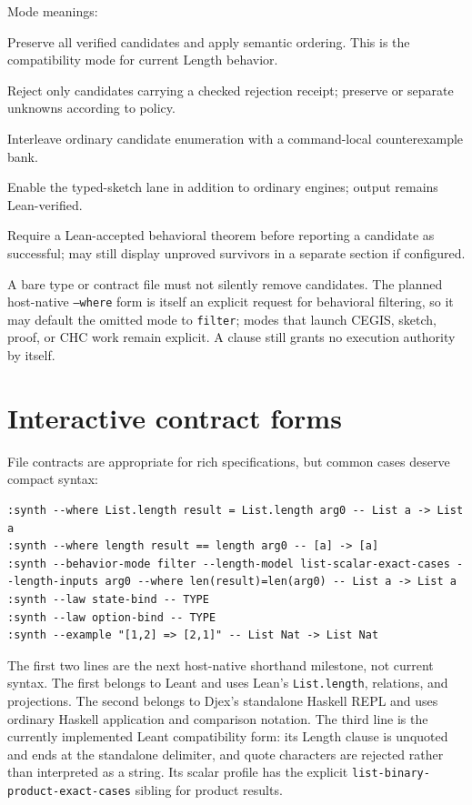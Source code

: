 \documentclass[11pt,oneside]{report}
\newcommand{\code}[1]{\texttt{#1}}
\begin{document}
Mode meanings:

\begin{description}[leftmargin=2.2em,style=nextline]
\item[rank.] Preserve all verified candidates and apply semantic ordering. This is the compatibility mode for current Length behavior.
\item[filter.] Reject only candidates carrying a checked rejection receipt; preserve or separate unknowns according to policy.
\item[cegis.] Interleave ordinary candidate enumeration with a command-local counterexample bank.
\item[sketch.] Enable the typed-sketch lane in addition to ordinary engines; output remains Lean-verified.
\item[prove.] Require a Lean-accepted behavioral theorem before reporting a candidate as successful; may still display unproved survivors in a separate section if configured.
\end{description}

A bare type or contract file must not silently remove candidates. The planned
host-native \code{--where} form is itself an explicit request for behavioral
filtering, so it may default the omitted mode to \code{filter}; modes that
launch CEGIS, sketch, proof, or CHC work remain explicit. A clause still grants
no execution authority by itself.

\section{Interactive contract forms}

File contracts are appropriate for rich specifications, but common cases deserve compact syntax:

\begin{lstlisting}[language={}]
:synth --where List.length result = List.length arg0 -- List a -> List a
:synth --where length result == length arg0 -- [a] -> [a]
:synth --behavior-mode filter --length-model list-scalar-exact-cases --length-inputs arg0 --where len(result)=len(arg0) -- List a -> List a
:synth --law state-bind -- TYPE
:synth --law option-bind -- TYPE
:synth --example "[1,2] => [2,1]" -- List Nat -> List Nat
\end{lstlisting}

The first two lines are the next host-native shorthand milestone, not current
syntax. The first belongs to Leant and uses Lean's \code{List.length},
relations, and projections. The second belongs to Djex's standalone Haskell
REPL and uses ordinary Haskell application and comparison notation. The third
line is the currently implemented Leant compatibility form: its Length clause
is unquoted and ends at the standalone delimiter, and quote characters are
rejected rather than interpreted as a string. Its scalar profile has the
explicit \code{list-binary-product-exact-cases} sibling for product results.
\end{document}
